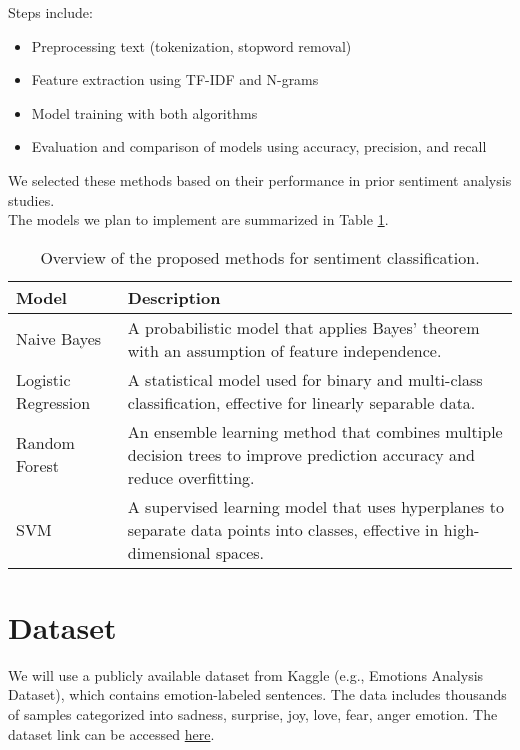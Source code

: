 \documentclass[runningheads]{llncs}
\begin{document}
Steps include:
\begin{itemize}
	\item Preprocessing text (tokenization, stopword removal)
	\item Feature extraction using TF-IDF and N-grams
	\item Model training with both algorithms
	\item Evaluation and comparison of models using accuracy, precision, and recall
\end{itemize}
We selected these methods based on their performance in prior sentiment analysis studies. \\

The models we plan to implement are summarized in Table \ref{tab:methods}.

\begin{table}[h!]
	\centering
	\begin{tabular}{|l|p{10cm}|}
		\hline
		\textbf{Model} & \textbf{Description} \\ \hline
		Naive Bayes & A probabilistic model that applies Bayes' theorem with an assumption of feature independence. \\ \hline
		Logistic Regression & A statistical model used for binary and multi-class classification, effective for linearly separable data. \\ \hline
		Random Forest & An ensemble learning method that combines multiple decision trees to improve prediction accuracy and reduce overfitting. \\ \hline
		SVM & A supervised learning model that uses hyperplanes to separate data points into classes, effective in high-dimensional spaces. \\ \hline
	\end{tabular}
	\caption{Overview of the proposed methods for sentiment classification.}
	\label{tab:methods}
\end{table}



\section{Dataset}
We will use a publicly available dataset from Kaggle (e.g., Emotions Analysis Dataset), which contains emotion-labeled sentences. The data includes thousands of samples categorized into sadness, surprise, joy, love, fear, anger emotion.
The dataset link can be accessed 
\textcolor{blue}{\href{https://www.kaggle.com/datasets/praveengovi/emotions-dataset-for-nlp/data}{here}}.
\end{document}
